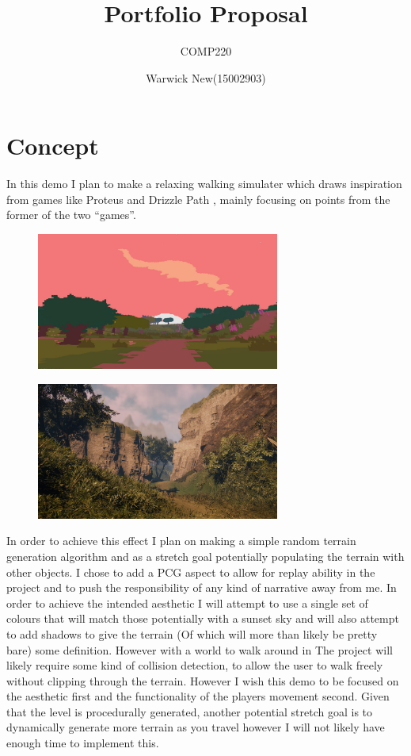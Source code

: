 \documentclass{scrartcl}
\title{Portfolio Proposal}
\subtitle{COMP220}
\author{Warwick New(15002903)}
\begin{document}
\maketitle

\section*{Concept}
In this demo I plan to make  a relaxing walking simulater which draws inspiration from games like Proteus \cite{proteus} and Drizzle Path \cite{drizzlepath}, mainly focusing on points from the former of the two ``games''.

\begin{figure}[h]
	\includegraphics[width=8cm]{Proteus}
	\centering
\end{figure}

\begin{figure}[h]
	\includegraphics[width=8cm]{DrizzlePath}
	\centering
\end{figure}

In order to achieve this effect I plan on making a simple random terrain generation algorithm and as a stretch goal potentially populating the terrain with other objects. I chose to add a PCG aspect to allow for replay ability in the project and to push the responsibility of any kind of narrative away from me. In order to achieve the intended aesthetic I will attempt to use a single set of colours that will match those potentially with a sunset sky and will also attempt to add shadows to give the terrain (Of which will more than likely be pretty bare) some definition. However with a world to walk around in The project will likely require some kind of collision detection, to allow the user to walk freely without clipping through the terrain. However I wish this demo to be focused on the aesthetic first and the functionality of the players movement second. Given that the level is procedurally generated, another potential stretch goal is to dynamically generate more terrain as you travel however I will not likely have enough time to implement this.
\end{document}
